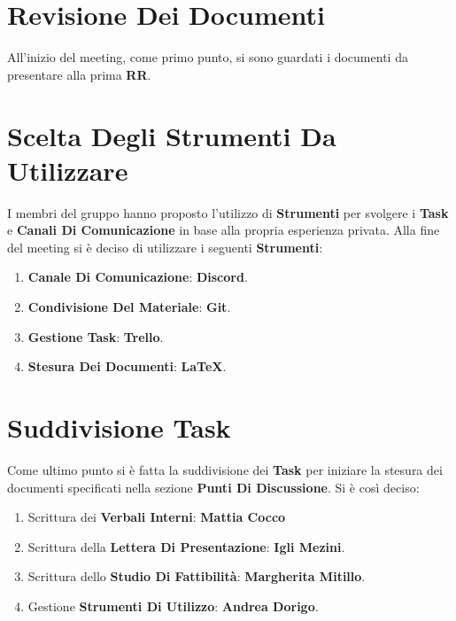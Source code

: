 	\section{Revisione Dei Documenti}
	All'inizio del meeting, come primo punto, si sono guardati i documenti da presentare alla prima \textbf{RR}.
	
	\section{Scelta Degli Strumenti Da Utilizzare}
	I membri del gruppo hanno proposto l'utilizzo di \textbf{Strumenti} per svolgere i \textbf{Task} e \textbf{Canali Di Comunicazione} in base alla propria esperienza privata.
	Alla fine del meeting si è deciso di utilizzare i seguenti \textbf{Strumenti}:
	\begin{enumerate}
		\item \textbf{Canale Di Comunicazione}: \textbf{Discord}.
		\item \textbf{Condivisione Del Materiale}: \textbf{Git}.
		\item \textbf{Gestione Task}: \textbf{Trello}.
		\item \textbf{Stesura Dei Documenti}: \textbf{LaTeX}.
	\end{enumerate}
	 
	\section{Suddivisione Task}
	Come ultimo punto si è fatta la suddivisione dei \textbf{Task} per iniziare la stesura dei documenti specificati nella sezione \textbf{Punti Di Discussione}.
	Si è così deciso:
	\begin{enumerate}
		\item Scrittura dei \textbf{Verbali Interni}: \textbf{Mattia Cocco}
		\item Scrittura della \textbf{Lettera Di Presentazione}: \textbf{Igli Mezini}.
		\item Scrittura dello \textbf{Studio Di Fattibilità}: \textbf{Margherita Mitillo}.
		\item Gestione \textbf{Strumenti Di Utilizzo}: \textbf{Andrea Dorigo}.
	\end{enumerate}